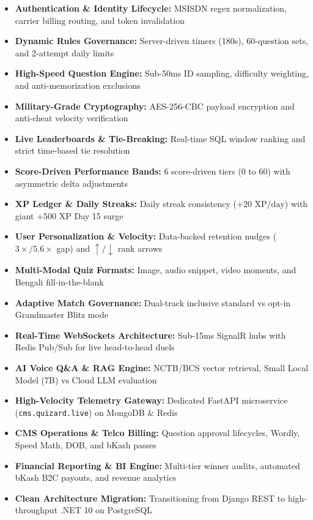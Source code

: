 \documentclass[11pt,a4paper,oneside]{report}
\begin{document}
\begin{titlepage}
    \begin{tcolorbox}[colback=white,colframe=cardBorder,width=0.95\linewidth,arc=2mm,title=\textbf{\sffamily Core System Pillars Covered}]
        \begin{itemize}\small
            \item \textbf{Authentication \& Identity Lifecycle:} MSISDN regex normalization, carrier billing routing, and token invalidation
            \item \textbf{Dynamic Rules Governance:} Server-driven timers (180s), 60-question sets, and 2-attempt daily limits
            \item \textbf{High-Speed Question Engine:} Sub-50ms ID sampling, difficulty weighting, and anti-memorization exclusions
            \item \textbf{Military-Grade Cryptography:} AES-256-CBC payload encryption and anti-cheat velocity verification
            \item \textbf{Live Leaderboards \& Tie-Breaking:} Real-time SQL window ranking and strict time-based tie resolution
            \item \textbf{Score-Driven Performance Bands:} 6 score-driven tiers (0 to 60) with asymmetric delta adjustments
            \item \textbf{XP Ledger \& Daily Streaks:} Daily streak consistency ($+20\text{ XP/day}$) with giant $+500\text{ XP}$ Day 15 surge
            \item \textbf{User Personalization \& Velocity:} Data-backed retention nudges ($3\times/5.6\times$ gap) and $\uparrow/\downarrow$ rank arrows
            \item \textbf{Multi-Modal Quiz Formats:} Image, audio snippet, video moments, and Bengali fill-in-the-blank
            \item \textbf{Adaptive Match Governance:} Dual-track inclusive standard vs opt-in Grandmaster Blitz mode
            \item \textbf{Real-Time WebSockets Architecture:} Sub-15ms SignalR hubs with Redis Pub/Sub for live head-to-head duels
            \item \textbf{AI Voice Q\&A \& RAG Engine:} NCTB/BCS vector retrieval, Small Local Model (7B) vs Cloud LLM evaluation
            \item \textbf{High-Velocity Telemetry Gateway:} Dedicated FastAPI microservice (\texttt{cms.quizard.live}) on MongoDB \& Redis
            \item \textbf{CMS Operations \& Telco Billing:} Question approval lifecycles, Wordly, Speed Math, DOB, and bKash passes
            \item \textbf{Financial Reporting \& BI Engine:} Multi-tier winner audits, automated bKash B2C payouts, and revenue analytics
            \item \textbf{Clean Architecture Migration:} Transitioning from Django REST to high-throughput .NET 10 on PostgreSQL
        \end{itemize}
    \end{tcolorbox}
    

\end{titlepage}
\end{document}
